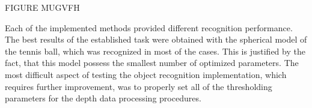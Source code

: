 FIGURE MUGVFH

Each of the implemented methods provided different recognition performance. The best results of the established task were obtained with the spherical model of the tennis ball, which was recognized in most of the cases. This is justified by the fact, that this model possess the smallest number of optimized parameters. The most difficult aspect of testing the object recognition implementation, which requires further improvement, was to properly set all of the thresholding parameters for the depth data processing procedures. 

